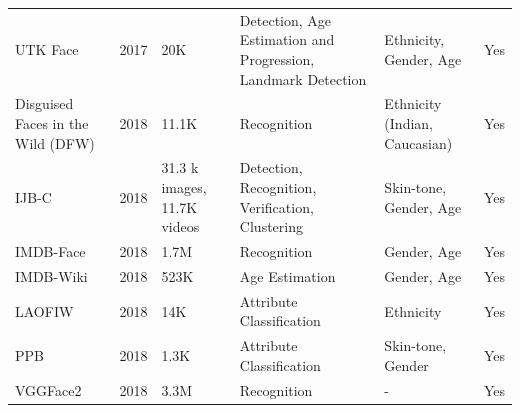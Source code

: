 \documentclass[journal]{IEEEtran}
\begin{document}
\begin{table}[!t]
\begin{tabular}{|p{}|C{0.025\textwidth}|C{0.09\textwidth}|p{0.19\textwidth}|p{0.2\textwidth}|C{0.06\textwidth}|}
UTK Face \cite{zhang2017age}                                                            & 2017          & 20K                         & Detection, Age Estimation and Progression, Landmark Detection                  & Ethnicity, Gender, Age                              & Yes                    \\
Disguised Faces in the Wild (DFW) \cite{kushwaha2018disguised}                          & 2018          & 11.1K                       & Recognition                                                                    & Ethnicity (Indian, Caucasian)                       & Yes                    \\
IJB-C \cite{maze2018iarpa}                                                              & 2018          & 31.3 k images, 11.7K videos & Detection, Recognition, Verification, Clustering                               & Skin-tone, Gender, Age                              & Yes                    \\
IMDB-Face \cite{wang2018devil}                                                          & 2018          & 1.7M                        & Recognition                                                                    & Gender, Age                                         & Yes                    \\
IMDB-Wiki \cite{rothe2018deep}                                                          & 2018          & 523K                        & Age Estimation                                                                 & Gender, Age                                         & Yes                    \\
LAOFIW \cite{alvi2018turning}                                                           & 2018          & 14K                         & Attribute Classification                                                       & Ethnicity                                           & Yes                    \\
PPB \cite{buolamwini2018gender}                                                         & 2018          & 1.3K                        & Attribute Classification                                                       & Skin-tone, Gender                                   & Yes                    \\
VGGFace2 \cite{cao2018vggface2}                                                         & 2018          & 3.3M                        & Recognition                                                                    & -                                                   & Yes                    \\

\end{tabular}
\end{table}
\end{document}

